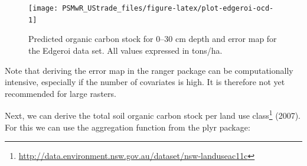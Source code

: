 \documentclass[graybox,natbib,nospthms,UStrade]{svmono}
\renewcommand{\href}[2]{#2 (\url{#1})}
\renewcommand{\href}[2]{#2\footnote{\url{#1}}}
\begin{document}
\begin{figure}[H]

{\centering \texttt{[image: PSMwR\_UStrade\_files/figure-latex/plot-edgeroi-ocd-1]} 

}

\caption{Predicted organic carbon stock for 0–30 cm depth and error map for the Edgeroi data set. All values expressed in tons/ha.}\label{fig:plot-edgeroi-ocd}
\end{figure}

Note that deriving the error map in the ranger package can be computationally intensive, especially if the number of covariates is high. It is therefore not yet recommended for large rasters.

Next, we can derive the total soil organic carbon stock per \href{http://data.environment.nsw.gov.au/dataset/nsw-landuseac11c}{land use class} (2007). For this we can use the aggregation function from the plyr package:
\end{document}
